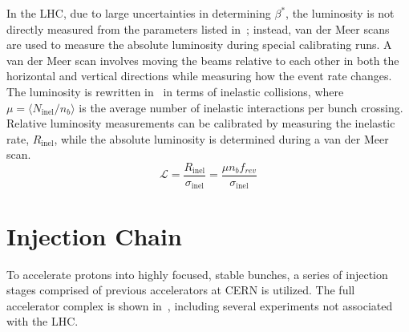 In the LHC, due to large uncertainties in determining $\beta^{*}$, the luminosity is not directly measured from the parameters listed in~\Eqn{\ref{eqn:inst_lumi}}; instead, van der Meer scans~\cite{vanderMeer} are used to measure the absolute luminosity during special calibrating runs. A van der Meer scan involves moving the beams relative to each other in both the horizontal and vertical directions while measuring how the event rate changes. The luminosity is rewritten in~\Eqn{\ref{eqn:inel_lumi}} in terms of inelastic collisions, where $\mu = \langle N_{\textrm{inel}}/n_b\rangle$ is the average number of inelastic interactions per bunch crossing. Relative luminosity measurements can be calibrated by measuring the inelastic rate, $R_{\textrm{inel}}$, while the absolute luminosity is determined during a van der Meer scan.
\begin{equation}
\mathcal{L} = \frac{R_{\textrm{inel}}}{\sigma_{\textrm{inel}}} = \frac{\mu n_b f_{rev}}{\sigma_{\textrm{inel}}}
\label{eqn:inel_lumi}
\end{equation}

%
\section{Injection Chain}
\label{ch:lhc:inj}
To accelerate protons into highly focused, stable bunches, a series of injection stages comprised of previous accelerators at CERN is utilized. The full accelerator complex is shown in~\Fig{\ref{fig:lhc_acc_comp}}, including several experiments not associated with the LHC.


